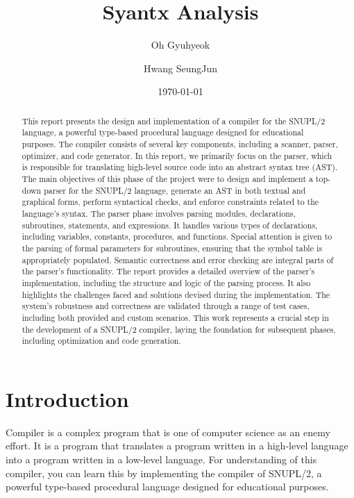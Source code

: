\documentclass[12pt]{article}
\title{Syantx Analysis}
\author[1]{Oh Gyuhyeok}
\author[1]{Hwang SeungJun}
\affil[1]{Department of Computer Science and Engineering, Seoul National University}
\date{\today}
\begin{document}
\maketitle

\begin{abstract}
    This report presents the design and implementation of a compiler for the SNUPL/2 language, a powerful type-based procedural language designed for educational purposes.
    The compiler consists of several key components, including a scanner, parser, optimizer, and code generator.
    In this report, we primarily focus on the parser, which is responsible for translating high-level source code into an abstract syntax tree (AST).
    The main objectives of this phase of the project were to design and implement a top-down parser for the SNUPL/2 language, generate an AST in both textual and graphical forms, perform syntactical checks, and enforce constraints related to the language's syntax.
    The parser phase involves parsing modules, declarations, subroutines, statements, and expressions.
    It handles various types of declarations, including variables, constants, procedures, and functions. Special attention is given to the parsing of formal parameters for subroutines, ensuring that the symbol table is appropriately populated.
    Semantic correctness and error checking are integral parts of the parser's functionality.
    The report provides a detailed overview of the parser's implementation, including the structure and logic of the parsing process.
    It also highlights the challenges faced and solutions devised during the implementation.
    The system's robustness and correctness are validated through a range of test cases, including both provided and custom scenarios.
    This work represents a crucial step in the development of a SNUPL/2 compiler, laying the foundation for subsequent phases, including optimization and code generation.
\end{abstract}

\section{Introduction}
Compiler is a complex program that is one of computer science as an enemy effort.
It is a program that translates a program written in a high-level language into a program written in a low-level language.
For understanding of this compiler, you can learn this by implementing the compiler of SNUPL/2\cite{Egger_git}, a powerful type-based procedural language designed for educational purposes.\\
\end{document}
